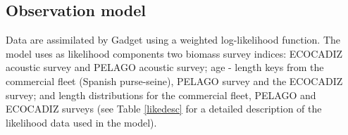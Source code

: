 \documentclass[review]{elsarticle}
\begin{document}


% 
% 
% 
% 
% 
% 

\subsection{Observation model}\label{obser}

Data are assimilated by Gadget using a weighted log-likelihood function.  The model uses as likelihood components two biomass survey indices: ECOCADIZ acoustic survey and PELAGO acoustic survey; age - length keys from the commercial fleet (Spanish purse-seine), PELAGO survey and the ECOCADIZ survey;  and length distributions for the commercial fleet, PELAGO and ECOCADIZ surveys (see Table \ref{likedesc} for a detailed description of the likelihood data used in the model). 
\end{document}
